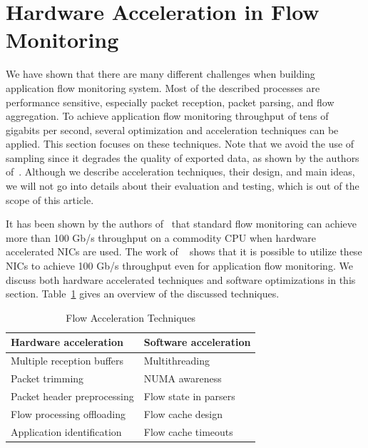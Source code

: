 \section{Hardware Acceleration in Flow Monitoring}


We have shown that there are many different challenges when building application flow monitoring system. Most of the described processes are performance sensitive, especially packet reception, packet parsing, and flow aggregation. To achieve application flow monitoring throughput of tens of gigabits per second, several optimization and acceleration techniques can be applied. This section focuses on these techniques. Note that we avoid the use of sampling since it degrades the quality of exported data, as shown by the authors of~\cite{Brauckhoff-2006-Impact}. Although we describe acceleration techniques, their design, and main ideas, we will not go into details about their evaluation and testing, which is out of the scope of this article. 

It has been shown by the authors of~\cite{Velan-2015-High} that standard flow monitoring can achieve more than 100 Gb/s throughput on a commodity CPU when hardware accelerated NICs are used. The work of \citeauthor{Kekely-2016-Software}~\cite{Kekely-2016-Software} shows that it is possible to utilize these NICs to achieve 100 Gb/s throughput even for application flow monitoring. We discuss both hardware accelerated techniques and software optimizations in this section. Table~\ref{tab:flow-acc-techniques} gives an overview of the discussed techniques.

\begin{table}[ht!]
    \centering
    \begin{tabular}{|l|l|}
    \hline
    \textbf{Hardware acceleration} & \textbf{Software acceleration} \\ \hline
    Multiple reception buffers & Multithreading \\
    Packet trimming & NUMA awareness \\
    Packet header preprocessing & Flow state in parsers \\
    Flow processing offloading & Flow cache design \\
    Application identification & Flow cache timeouts \\ \hline
    \end{tabular}
    \caption{Flow Acceleration Techniques}
    \label{tab:flow-acc-techniques}
\end{table}


